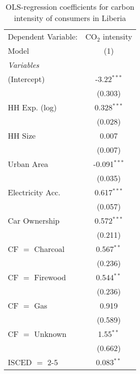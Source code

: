 
\begin{table}[htbp!]
   \centering
   \small
   \begin{adjustbox}{width = 1\textwidth, max height = 0.95\textheight, center}
      \begin{threeparttable}[b]
         \caption{\label{tab:OLS_1_LBR} OLS-regression coefficients for carbon intensity of consumers in Liberia}
         \begin{tabular}{lc}
            \tabularnewline \midrule \midrule
            Dependent Variable: & CO$_{2}$ intensity\\  
            Model               & (1)\\  
            \midrule
            \emph{Variables}\\
            (Intercept)         & -3.22$^{***}$\\   
                                & (0.303)\\   
            HH Exp. (log)       & 0.328$^{***}$\\   
                                & (0.028)\\   
            HH Size             & 0.007\\   
                                & (0.007)\\   
            Urban Area          & -0.091$^{***}$\\   
                                & (0.035)\\   
            Electricity Acc.    & 0.617$^{***}$\\   
                                & (0.057)\\   
            Car Ownership       & 0.572$^{***}$\\   
                                & (0.211)\\   
            CF $=$ Charcoal     & 0.567$^{**}$\\   
                                & (0.236)\\   
            CF $=$ Firewood     & 0.544$^{**}$\\   
                                & (0.236)\\   
            CF $=$ Gas          & 0.919\\   
                                & (0.589)\\   
            CF $=$ Unknown      & 1.55$^{**}$\\   
                                & (0.662)\\   
            ISCED $=$ 2-5       & 0.083$^{**}$\\   

\end{tabular}
\end{threeparttable}
\end{adjustbox}
\end{table}
